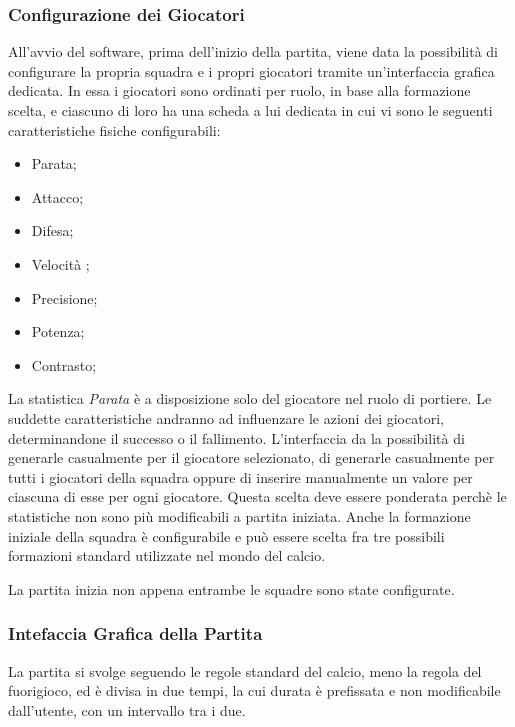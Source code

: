 \subsubsection*{Configurazione dei Giocatori}
%
\label{sec:conf_giocatori}
All'avvio del software, prima dell'inizio della partita, viene data la possibilit\`{a} di configurare la propria squadra e i propri giocatori tramite un'interfaccia grafica dedicata. In essa i giocatori sono ordinati per ruolo, in base alla formazione scelta, e ciascuno di loro ha una scheda a lui dedicata in cui vi sono le seguenti caratteristiche fisiche configurabili:
\begin{itemize}
\item Parata;
\item Attacco;
\item Difesa;
\item Velocit\`{a} ;
\item Precisione;
\item Potenza;
\item Contrasto;
\end{itemize}
\noindent La statistica \emph{Parata} \`{e} a disposizione solo del giocatore nel ruolo di portiere. Le suddette caratteristiche andranno ad influenzare le azioni dei giocatori, determinandone il successo o il fallimento. L'interfaccia da la possibilit\`{a} di generarle casualmente per il giocatore selezionato, di generarle casualmente per tutti i giocatori della squadra oppure di inserire manualmente un valore per ciascuna di esse per ogni giocatore. Questa scelta deve essere ponderata perch\`{e} le statistiche non sono pi\`{u} modificabili a partita iniziata. Anche la formazione iniziale della squadra \`{e} configurabile e pu\`{o} essere scelta fra tre possibili formazioni standard utilizzate nel mondo del calcio.

La partita inizia non appena entrambe le squadre sono state configurate.

\subsubsection*{Intefaccia Grafica della Partita}
%
\label{sec:gui_partita}
La partita si svolge seguendo le regole standard del calcio, meno la regola del fuorigioco, ed \`{e} divisa in due tempi, la cui durata \`{e} prefissata e non modificabile dall'utente, con un intervallo tra i due.


